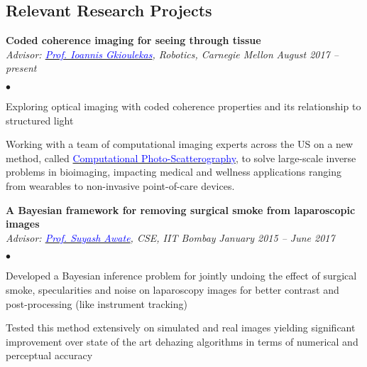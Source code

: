 \documentclass[margin,line]{res}
\newenvironment{list2}{
  \begin{list}{$\bullet$}{%
      \setlength{\itemsep}{0in}
      \setlength{\parsep}{0in} \setlength{\parskip}{0in}
      \setlength{\topsep}{0in} \setlength{\partopsep}{0in} 
      \setlength{\leftmargin}{0.18in}}}{\end{list}}
\begin{document}
\begin{resume}
\section{\sc Relevant Research Projects}


{\bf Coded coherence imaging for seeing through tissue} \\
{\em Advisor: \href{https://www.cs.cmu.edu/~igkioule}{\textcolor{blue}{Prof. Ioannis Gkioulekas}}, Robotics, Carnegie Mellon} \hfill {\it August 2017 -- present} \\
\vspace*{-.13in}
\begin{list2}
\item Exploring optical imaging with coded coherence properties and its relationship to structured light
\item Working with a team of computational imaging experts across the US on a new method, called \href{http://seebelowtheskin.rice.edu/}{\textcolor{blue}{Computational Photo-Scatterography}}, to solve large-scale inverse problems in bioimaging, impacting medical and wellness applications ranging from wearables to non-invasive point-of-care devices.
\end{list2}

\vspace*{-0.1in}

{\bf A Bayesian framework for removing surgical smoke from laparoscopic images} \\
{\em Advisor: \href{https://www.cse.iitb.ac.in/~suyash}{\textcolor{blue}{Prof. Suyash Awate}}, CSE, IIT Bombay} \hfill {\it January 2015 -- June 2017} \\
\vspace*{-.13in}
\begin{list2}
\item Developed a Bayesian inference problem for jointly undoing the effect of surgical smoke, specularities and noise on laparoscopy images for better contrast and post-processing (like instrument tracking)
\item Tested this method extensively on simulated and real images yielding significant improvement over state of the art dehazing algorithms in terms of numerical and perceptual accuracy
\end{list2}

\vspace*{-0.1in}


\end{resume}
\end{document}

